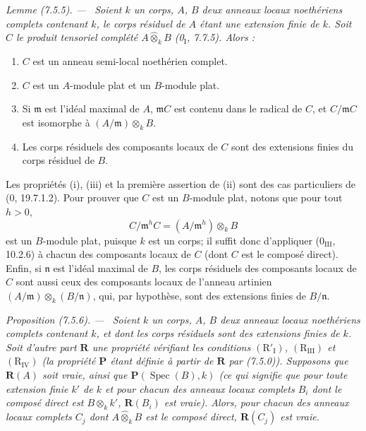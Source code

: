 \documentclass[10pt,oneside]{book}
\newenvironment{proposition}[1][]{%
  \par\medskip\noindent\itshape Proposition (#1). ---\ }{\par}
\newenvironment{lemma}[1][]{%
  \par\medskip\noindent\itshape Lemme (#1). ---\ }{\par}
\begin{document}
\begin{lemma}[7.5.5]
\label{IV.2.s7.5.5-fr}
Soient $k$ un corps, $A$, $B$ deux anneaux locaux noethériens complets
contenant $k$, le corps résiduel de $A$ étant une extension finie de $k$. Soit
$C$ le produit tensoriel complété $A\widehat\otimes_k B$
(0$_{\mathrm I}$, 7.7.5). Alors :
\begin{enumerate}
\item[\emph{(i)}] $C$ est un anneau semi-local noethérien complet.
\item[\emph{(ii)}] $C$ est un $A$-module plat et un $B$-module plat.
\item[\emph{(iii)}] Si $\mathfrak m$ est l'idéal maximal de $A$,
$\mathfrak mC$ est contenu dans le radical de $C$, et $C/\mathfrak mC$ est
isomorphe à $(A/\mathfrak m)\otimes_k B$.
\item[\emph{(iv)}] Les corps résiduels des composants locaux de $C$ sont des
extensions finies du corps résiduel de $B$.
\end{enumerate}
Les propriétés (i), (iii) et la première assertion de (ii) sont des cas
particuliers de (0, 19.7.1.2). Pour prouver que $C$ est un $B$-module plat,
notons que pour tout $h>0$,
\[
C/\mathfrak m^hC=(A/\mathfrak m^h)\otimes_k B
\]
est un $B$-module plat, puisque $k$ est un corps; il suffit donc d'appliquer
(0$_{\mathrm{III}}$, 10.2.6) à chacun des composants locaux de $C$ (dont $C$
est le composé direct). Enfin, si $\mathfrak n$ est l'idéal maximal de $B$, les
corps résiduels des composants locaux de $C$ sont aussi ceux des composants
locaux de l'anneau artinien
$(A/\mathfrak m)\otimes_k(B/\mathfrak n)$, qui, par hypothèse, sont des
extensions finies de $B/\mathfrak n$.
\end{lemma}

\begin{proposition}[7.5.6]
\label{IV.2.s7.5.6-fr}
Soient $k$ un corps, $A$, $B$ deux anneaux locaux noethériens complets
contenant $k$, et dont les corps résiduels sont des extensions finies de $k$.
Soit d'autre part $\boldsymbol R$ une propriété vérifiant les conditions
$(\mathrm R'_{\mathrm I})$, $(\mathrm R_{\mathrm{III}})$ et
$(\mathrm R_{\mathrm{IV}})$ (la propriété $\boldsymbol P$ étant définie à
partir de $\boldsymbol R$ par (7.5.0)). Supposons que $\boldsymbol R(A)$ soit
vraie, ainsi que $\boldsymbol P(\operatorname{Spec}(B),k)$ (ce qui signifie que
pour toute extension finie $k'$ de $k$ et pour chacun des anneaux locaux
complets $B_i$ dont le composé direct est $B\otimes_k k'$,
$\boldsymbol R(B_i)$ est vraie). Alors, pour chacun des anneaux locaux complets
$C_j$ dont $A\widehat\otimes_k B$ est le composé direct,
$\boldsymbol R(C_j)$ est vraie.
\end{proposition}
\end{document}
